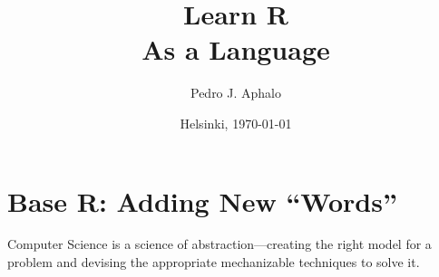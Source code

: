 \documentclass[krantz2]{krantz}\usepackage{knitr}
\begin{document}

\title{\Huge{\sffamily Learn R\\{\Large As a Language}}}

\author{Pedro J. Aphalo}

\date{Helsinki, \today}


















\frontmatter

\maketitle

\newpage

\setcounter{page}{5} %
\tableofcontents
\listoffigures
\listoftables



%



\mainmatter














\chapter{Base R: Adding New ``Words''}\label{chap:R:functions}

\begin{VF}
Computer Science is a science of abstraction---creating the right model for a problem and devising the appropriate mechanizable techniques to solve it.

\nocite{Aho1992}
\end{VF}

\end{document}
